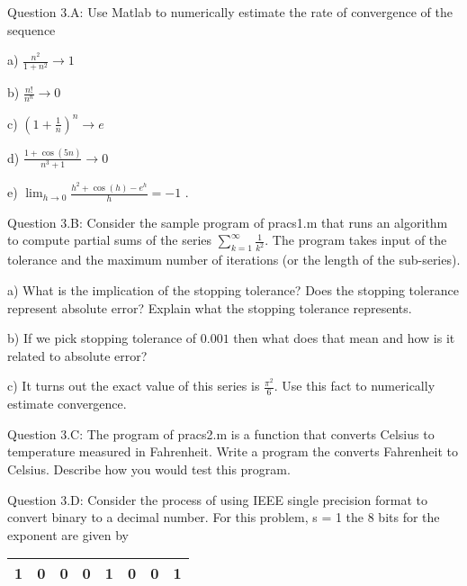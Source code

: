 \documentclass{article}
\def\ds{\displaystyle}
\begin{document}
\par \medskip \noindent
%
Question 3.A: Use Matlab to numerically estimate the rate of convergence of the sequence \par
a) $\ds \frac {n^2}{1+n^2} \rightarrow 1$ \par
b) $\ds \frac {n!}{n^n} \rightarrow 0$ \par
c) $\ds (1 + \frac 1n)^n \rightarrow e$ \par
d) $\ds \frac {1 + \cos (5n)}{n^3 + 1} \rightarrow 0$ \par
e) $\ds \lim_{h \rightarrow 0}\frac {h^2 + \cos (h) - e^h}h = -1$
. \medskip \par \noindent
%
Question 3.B: Consider the sample program of pracs1.m that runs an algorithm to compute partial sums of the series $\ds \sum_{k=1}^{\infty} \frac 1{k^2}$. The program takes input of the tolerance and the maximum number of iterations (or the length of the sub-series). \par
a) What is the implication of the stopping tolerance? Does the stopping tolerance represent absolute error?  Explain what the stopping tolerance represents. \par
b) If we pick stopping tolerance of $\ds 0.001$ then what does that mean and how is it related to absolute error? \par
c) It turns out the exact value of this series is $\ds \frac {\pi ^2}6$. Use this fact to numerically estimate convergence. 
  \medskip \par \noindent
%
Question 3.C: The program of pracs2.m is a function that converts Celsius to temperature measured in Fahrenheit. Write a program the converts Fahrenheit to Celsius. Describe how you would test this program. 
\medskip \par \noindent
%
Question 3.D: Consider the process of using IEEE single precision format to convert binary to a decimal number. For this problem, s = 1 the 8 bits for the exponent are given by

\begin{tabular}{|c|c|c|c|c|c|c|c|}
\hline
1 & 0 & 0 & 0 & 1 & 0 & 0 & 1\\
\hline
\end{tabular}
\end{document}
